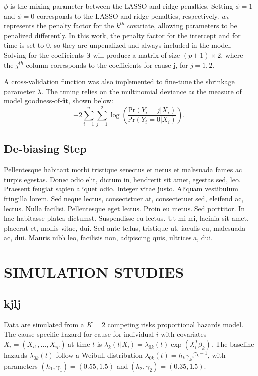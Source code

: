 \documentclass[AMA,Times1COL]{WileyNJDv5} %
\begin{document}
$\phi$ is the mixing parameter between the LASSO and ridge penalties. Setting $\phi=1$ and $\phi=0$ corresponds to the LASSO and ridge penalties, respectively. $w_{k}$ represents the penalty factor for the $k^{th}$ covariate, allowing parameters to be penalized differently. In this work, the penalty factor for the intercept and for time is set to 0, so they are unpenalized and always included in the model. Solving for the coefficients $\boldsymbol{\beta}$ will produce a matrix of size $(p+1)\times2$, where the $j^{th}$ column corresponds to the coefficients for cause j, for $j=1,2$.

A cross-validation function was also implemented to fine-tune the shrinkage parameter $\lambda$. The tuning relies on the multinomial deviance as the measure of model goodness-of-fit, shown below:
$$-2\sum_{i=1}^{n}\sum_{j=1}^{2}\log(\frac{\text{Pr}(Y_{i}=j|X_{i})}{\text{Pr}(Y_{i}=0|X_{i})}).$$

\subsection{De-biasing Step}

Pellentesque habitant morbi tristique senectus et netus et malesuada fames ac turpis egestas. Donec odio elit, dictum
in, hendrerit sit amet, egestas sed, leo. Praesent feugiat sapien aliquet odio. Integer vitae justo. Aliquam vestibulum
fringilla lorem. Sed neque lectus, consectetuer at, consectetuer sed, eleifend ac, lectus. Nulla facilisi. Pellentesque
eget lectus. Proin eu metus. Sed porttitor. In hac habitasse platea dictumst. Suspendisse eu lectus. Ut mi mi, lacinia
sit amet, placerat et, mollis vitae, dui. Sed ante tellus, tristique ut, iaculis eu, malesuada ac, dui. Mauris nibh leo,
facilisis non, adipiscing quis, ultrices a, dui.


\section{SIMULATION STUDIES}\label{sec3}

\subsection{kjlj}

Data are simulated from a $K=2$ competing risks proportional hazards model. The cause-specific hazard for cause for individual $i$ with covariates $X_i = (X_{i1}, \dots, X_{ip})$ at time $t$ is $\lambda_k(t | X_i) = \lambda_{0k}(t) \exp(X_i^T \beta_k)$. The baseline hazards $\lambda_{0k}(t)$ follow a Weibull distribution $\lambda_{0k}(t) = h_k \gamma_k t^{\gamma_k - 1}$, with parameters $(h_1, \gamma_1)=(0.55, 1.5)$ and $(h_2, \gamma_2)=(0.35, 1.5)$.
\end{document}
